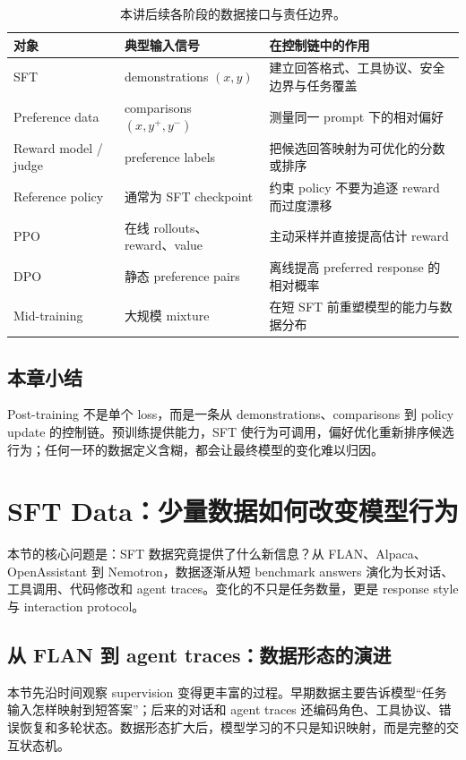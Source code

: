 \documentclass[a4paper]{article}
\begin{document}
\begin{table}[H]
\centering
\begin{tabular}{L{0.17\textwidth}L{0.27\textwidth}L{0.46\textwidth}}
\toprule
对象 & 典型输入信号 & 在控制链中的作用 \\
\midrule
SFT & demonstrations $(x,y)$ & 建立回答格式、工具协议、安全边界与任务覆盖 \\
Preference data & comparisons $(x,y^+,y^-)$ & 测量同一 prompt 下的相对偏好 \\
Reward model / judge & preference labels & 把候选回答映射为可优化的分数或排序 \\
Reference policy & 通常为 SFT checkpoint & 约束 policy 不要为追逐 reward 而过度漂移 \\
PPO & 在线 rollouts、reward、value & 主动采样并直接提高估计 reward \\
DPO & 静态 preference pairs & 离线提高 preferred response 的相对概率 \\
Mid-training & 大规模 mixture & 在短 SFT 前重塑模型的能力与数据分布 \\
\bottomrule
\end{tabular}
\caption{本讲后续各阶段的数据接口与责任边界。}
\end{table}

\subsection{本章小结}

Post-training 不是单个 loss，而是一条从 demonstrations、comparisons 到 policy update 的控制链。预训练提供能力，SFT 使行为可调用，偏好优化重新排序候选行为；任何一环的数据定义含糊，都会让最终模型的变化难以归因。

\section{SFT Data：少量数据如何改变模型行为}

本节的核心问题是：SFT 数据究竟提供了什么新信息？从 FLAN、Alpaca、OpenAssistant 到 Nemotron，数据逐渐从短 benchmark answers 演化为长对话、工具调用、代码修改和 agent traces。变化的不只是任务数量，更是 response style 与 interaction protocol。

\subsection{从 FLAN 到 agent traces：数据形态的演进}

本节先沿时间观察 supervision 变得更丰富的过程。早期数据主要告诉模型“任务输入怎样映射到短答案”；后来的对话和 agent traces 还编码角色、工具协议、错误恢复和多轮状态。数据形态扩大后，模型学习的不只是知识映射，而是完整的交互状态机。
\end{document}
